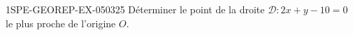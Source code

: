 \begin{exercice}{1SPE-GEOREP-EX-050}{3}{25}
Déterminer le point de la droite $\mathcal{D} : 2x + y - 10 = 0$ le plus proche de l'origine $O$.
\end{exercice}
